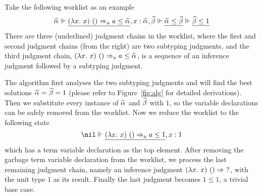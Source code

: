 Take the following worklist as an example
$$\al \Vdash \underline{(\lam x)~() \To_a a \le \al} , x:\al, \bt \Vdash \underline{\al \le \bt} \Vdash \underline{\bt \le 1}$$
There are three (underlined) judgment chains in the worklist,
where the first and second judgment chains (from the right) are two subtyping judgments,
and the third judgment chain, $(\lam x)~() \To_a a \le \al$,
is a sequence of an inference judgment followed by a subtyping judgment.

The algorithm first analyses the two subtyping judgments and
will find the best solutions $\al = \bt = 1$
(please refer to Figure~\ref{fig:alg} for detailed derivations).
Then we substitute every instance of $\al$ and $\bt$ with $1$,
so the variable declarations can be safely removed from the worklist.
Now we reduce the worklist to the following state
$$\nil \Vdash \underline{(\lam x)~() \To_a a \le 1}, x:1$$
which has a term variable declaration as the top element.
After removing the garbage term variable declaration from the worklist, we process the last remaining judgment chain,
namely an inference judgment $(\lam x)~()\To~?$, with the unit type $1$ as its result.
Finally the last judgment becomes $1 \le 1$, a trivial base case.




